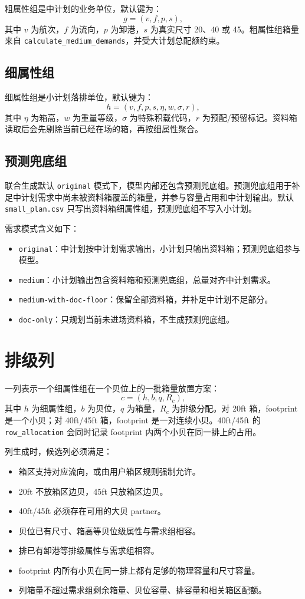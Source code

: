 \documentclass[UTF8,a4paper,11pt]{ctexart}
\newcommand{\code}[1]{\nolinkurl{#1}}
\begin{document}
粗属性组是中计划的业务单位，默认键为：
\[
g=(v,f,p,s),
\]
其中 \(v\) 为航次，\(f\) 为流向，\(p\) 为卸港，\(s\) 为真实尺寸 20、40 或 45。粗属性组箱量来自 \code{calculate_medium_demands}，并受大计划总配额约束。

\subsection{细属性组}

细属性组是小计划落排单位，默认键为：
\[
h=(v,f,p,s,\eta,w,\sigma,r),
\]
其中 \(\eta\) 为箱高，\(w\) 为重量等级，\(\sigma\) 为特殊积载代码，\(r\) 为预配/预留标记。资料箱读取后会先剔除当前已经在场的箱，再按细属性聚合。

\subsection{预测兜底组}

联合生成默认 \code{original} 模式下，模型内部还包含预测兜底组。预测兜底组用于补足中计划需求中尚未被资料箱覆盖的箱量，并参与容量占用和中计划输出。默认 \code{small_plan.csv} 只写出资料箱细属性组，预测兜底组不写入小计划。

需求模式含义如下：
\begin{itemize}
  \item \code{original}：中计划按中计划需求输出，小计划只输出资料箱；预测兜底组参与模型。
  \item \code{medium}：小计划输出包含资料箱和预测兜底组，总量对齐中计划需求。
  \item \code{medium-with-doc-floor}：保留全部资料箱，并补足中计划不足部分。
  \item \code{doc-only}：只规划当前未进场资料箱，不生成预测兜底组。
\end{itemize}

\section{排级列}

一列表示一个细属性组在一个贝位上的一批箱量放置方案：
\[
c=(h,b,q,R_c),
\]
其中 \(h\) 为细属性组，\(b\) 为贝位，\(q\) 为箱量，\(R_c\) 为排级分配。对 20ft 箱，footprint 是一个小贝；对 40ft/45ft 箱，footprint 是一对连续小贝。40ft/45ft 的 \code{row_allocation} 会同时记录 footprint 内两个小贝在同一排上的占用。

列生成时，候选列必须满足：
\begin{itemize}
  \item 箱区支持对应流向，或由用户箱区规则强制允许。
  \item 20ft 不放箱区边贝，45ft 只放箱区边贝。
  \item 40ft/45ft 必须存在可用的大贝 partner。
  \item 贝位已有尺寸、箱高等贝位级属性与需求组相容。
  \item 排已有卸港等排级属性与需求组相容。
  \item footprint 内所有小贝在同一排上都有足够的物理容量和尺寸容量。
  \item 列箱量不超过需求组剩余箱量、贝位容量、排容量和相关箱区配额。
\end{itemize}
\end{document}
